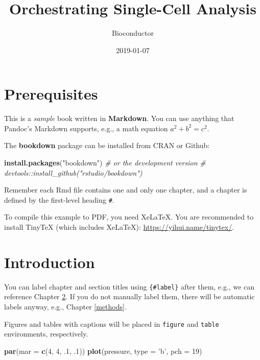 \documentclass[]{book}
\title{Orchestrating Single-Cell Analysis}
\author{Bioconductor}
\date{2019-01-07}
\newenvironment{Shaded}{\begin{snugshade}}{\end{snugshade}}
\newcommand{\CommentTok}[1]{\textcolor[rgb]{0.56,0.35,0.01}{\textit{#1}}}
\newcommand{\DataTypeTok}[1]{\textcolor[rgb]{0.13,0.29,0.53}{#1}}
\newcommand{\DecValTok}[1]{\textcolor[rgb]{0.00,0.00,0.81}{#1}}
\newcommand{\FloatTok}[1]{\textcolor[rgb]{0.00,0.00,0.81}{#1}}
\newcommand{\KeywordTok}[1]{\textcolor[rgb]{0.13,0.29,0.53}{\textbf{#1}}}
\newcommand{\NormalTok}[1]{#1}
\newcommand{\StringTok}[1]{\textcolor[rgb]{0.31,0.60,0.02}{#1}}
\begin{document}
\maketitle

{
\setcounter{tocdepth}{1}
\tableofcontents
}
\hypertarget{prerequisites}{%
\chapter{Prerequisites}\label{prerequisites}}

This is a \emph{sample} book written in \textbf{Markdown}. You can use anything that Pandoc's Markdown supports, e.g., a math equation \(a^2 + b^2 = c^2\).

The \textbf{bookdown} package can be installed from CRAN or Github:

\begin{Shaded}
\begin{Highlighting}[]
\KeywordTok{install.packages}\NormalTok{(}\StringTok{"bookdown"}\NormalTok{)}
\CommentTok{# or the development version}
\CommentTok{# devtools::install_github("rstudio/bookdown")}
\end{Highlighting}
\end{Shaded}

Remember each Rmd file contains one and only one chapter, and a chapter is defined by the first-level heading \texttt{\#}.

To compile this example to PDF, you need XeLaTeX. You are recommended to install TinyTeX (which includes XeLaTeX): \url{https://yihui.name/tinytex/}.

\hypertarget{intro}{%
\chapter{Introduction}\label{intro}}

You can label chapter and section titles using \texttt{\{\#label\}} after them, e.g., we can reference Chapter \ref{intro}. If you do not manually label them, there will be automatic labels anyway, e.g., Chapter \ref{methods}.

Figures and tables with captions will be placed in \texttt{figure} and \texttt{table} environments, respectively.

\begin{Shaded}
\begin{Highlighting}[]
\KeywordTok{par}\NormalTok{(}\DataTypeTok{mar =} \KeywordTok{c}\NormalTok{(}\DecValTok{4}\NormalTok{, }\DecValTok{4}\NormalTok{, }\FloatTok{.1}\NormalTok{, }\FloatTok{.1}\NormalTok{))}
\KeywordTok{plot}\NormalTok{(pressure, }\DataTypeTok{type =} \StringTok{'b'}\NormalTok{, }\DataTypeTok{pch =} \DecValTok{19}\NormalTok{)}
\end{Highlighting}
\end{Shaded}
\end{document}
